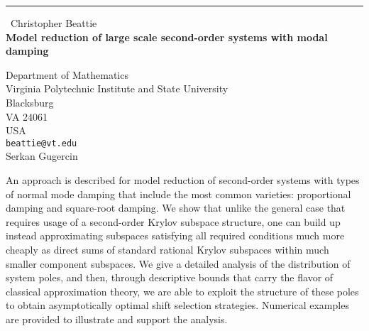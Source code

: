 \documentclass{report}
\begin{document}
\begin{center}
\rule{6in}{1pt} \
{\large Christopher Beattie \\
{\bf Model reduction of large scale second-order systems with modal damping}}

Department of Mathematics \\ Virginia Polytechnic Institute and State University \\ Blacksburg \\ VA 24061 \\ USA
\\
{\tt beattie@vt.edu}\\
Serkan Gugercin\end{center}

An approach is described for model reduction of second-order systems
with types of normal mode damping that include the most common
varieties: proportional damping and square-root damping.
We show that unlike the general case that requires usage
of a second-order Krylov subspace structure, one can build up instead
approximating subspaces satisfying all required conditions much
more cheaply as direct sums of standard rational Krylov subspaces
within much smaller component subspaces.
We give a detailed analysis of the distribution of system poles,
and then, through descriptive bounds that carry the flavor of classical
approximation theory, we are able to exploit the structure of these
poles to obtain asymptotically optimal shift selection strategies.
Numerical examples are provided to illustrate and support the analysis.
\end{document}
